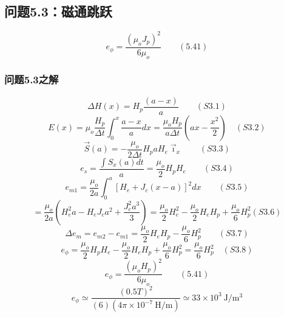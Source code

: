 \subsection{问题5.3：磁通跳跃}

\begin{equation}%
e_{\phi}=\frac{(\mu_{o}J_{p})^{2}}{6\mu_{o}}\qquad(5.41)
\end{equation}

\subsubsection{问题5.3之解}

\begin{equation}%
\Delta H(x)=H_{p}\frac{(a-x)}{a}\qquad(S3.1)
\end{equation}
\begin{equation}%
E(x)=\mu_{o}\frac{H_{p}}{\Delta t}\int_{0}^{x}\frac{a-x}{a}dx=\frac{\mu_{o}H_{p}}{a\Delta t}(ax-\frac{x^{2}}{2})\quad(S3.2)
\end{equation}
\begin{equation}%
\vec{S}(a)=-\frac{\mu_{o}}{2\Delta t}H_{p}aH_{e}\vec{\imath}_{x}\qquad(S3.3)
\end{equation}
\begin{equation}%
e_{s}=\frac{\int S_{x}(a)dt}{a}=\frac{\mu_{o}}{2}H_{p}H_{e}\qquad(S3.4)
\end{equation}
\begin{equation}%
e_{m1}=\frac{\mu_{o}}{2a}\int_{0}^{a}[H_{e}+J_{c}(x-a)]^{2}dx\qquad(S3.5)
\end{equation}
\begin{equation}%
=\frac{\mu_{o}}{2a}(H_{e}^{2}a-H_{e}J_{c}a^{2}+\frac{J_{c}^{2}a^{3}}{3})=\frac{\mu_{o}}{2}H_{e}^{2}-\frac{\mu_{o}}{2}H_{e}H_{p}+\frac{\mu_{o}}{6}H_{p}^{2}(S3.6)
\end{equation}
\begin{equation}%
\Delta e_{m}=e_{m2}-e_{m1}=\frac{\mu_{o}}{2}H_{e}H_{p}-\frac{\mu_{o}}{6}H_{p}^{2}\qquad(S3.7)
\end{equation}
\begin{equation}%
e_{\phi}=\frac{\mu_{o}}{2}H_{p}H_{e}-\frac{\mu_{o}}{2}H_{e}H_{p}+\frac{\mu_{o}}{6}H_{p}^{2}=\frac{\mu_{o}}{6}H_{p}^{2}\quad(S3.8)
\end{equation}
\begin{equation}%
e_{\phi}=\frac{(\mu_{o}H_{p})^{2}}{6\mu_{o}}\qquad(5.41)
\end{equation}
\begin{equation}%
e_{\phi}\simeq\frac{(0.5T)^{2}}{(6)(4\pi\times10^{-7}\ \mathrm{H/m})}\simeq33\times10^{3}\ \mathrm{J/m^{3}}
\end{equation}


